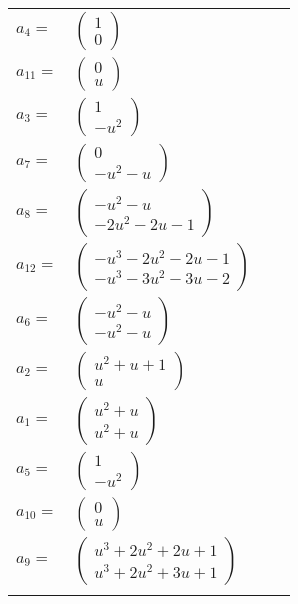 \documentclass[1p]{elsarticle_modified}
\theoremstyle{definition}
\begin{document}
\begin{tabular}{m{7pt} m{180pt} m{7pt} m{180pt} }
\flushright $a_{4}=$&$\begin{pmatrix}1\\0\end{pmatrix}$ \\
\flushright $a_{11}=$&$\begin{pmatrix}0\\u\end{pmatrix}$ \\
\flushright $a_{3}=$&$\begin{pmatrix}1\\- u^2\end{pmatrix}$ \\
\flushright $a_{7}=$&$\begin{pmatrix}0\\- u^2- u\end{pmatrix}$ \\
\flushright $a_{8}=$&$\begin{pmatrix}- u^2- u\\-2 u^2-2 u-1\end{pmatrix}$ \\
\flushright $a_{12}=$&$\begin{pmatrix}- u^3-2 u^2-2 u-1\\- u^3-3 u^2-3 u-2\end{pmatrix}$ \\
\flushright $a_{6}=$&$\begin{pmatrix}- u^2- u\\- u^2- u\end{pmatrix}$ \\
\flushright $a_{2}=$&$\begin{pmatrix}u^2+u+1\\u\end{pmatrix}$ \\
\flushright $a_{1}=$&$\begin{pmatrix}u^2+u\\u^2+u\end{pmatrix}$ \\
\flushright $a_{5}=$&$\begin{pmatrix}1\\- u^2\end{pmatrix}$ \\
\flushright $a_{10}=$&$\begin{pmatrix}0\\u\end{pmatrix}$ \\
\flushright $a_{9}=$&$\begin{pmatrix}u^3+2 u^2+2 u+1\\u^3+2 u^2+3 u+1\end{pmatrix}$\\&\end{tabular}
\end{document}

